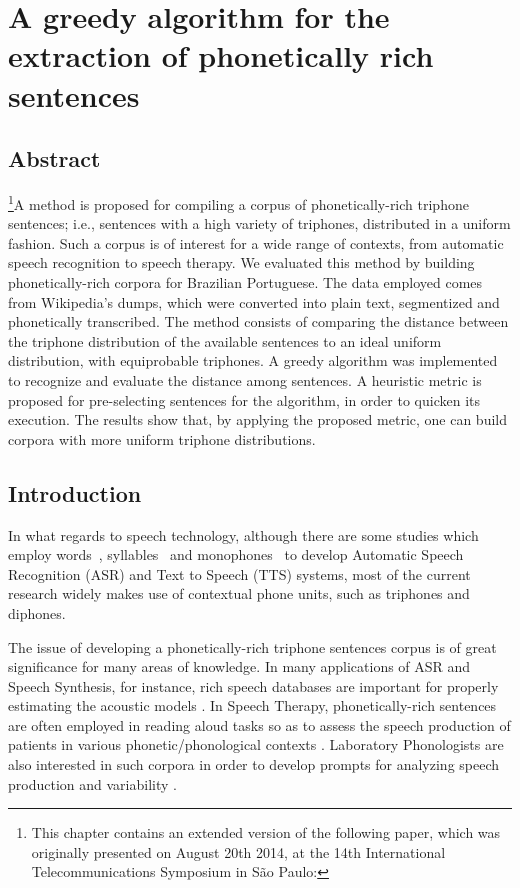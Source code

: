 \chapter{A greedy algorithm for the extraction of phonetically rich sentences}\label{ch:phonetically-rich}

\section*{Abstract}

\footnote{This chapter contains an extended version of the following paper, which was originally presented on August 20th 2014, at the 14th International Telecommunications Symposium in S\~ao Paulo: }A method is proposed for compiling a corpus of phonetically-rich triphone sentences; 
i.e., sentences with a high variety of triphones, distributed in a uniform fashion. 
Such a corpus is of interest for a wide range of contexts, from automatic speech 
recognition to speech therapy. We evaluated this method by building phonetically-rich corpora for Brazilian Portuguese. The data employed comes 
from Wikipedia's dumps, which were converted into plain text, segmentized and 
phonetically transcribed. The method consists of comparing the distance between 
the triphone distribution of the available sentences to an ideal uniform distribution, with 
equiprobable triphones. A greedy algorithm was implemented to recognize and evaluate 
the distance among sentences. A heuristic metric is proposed for pre-selecting 
sentences for the algorithm, in order to quicken its execution. The results show 
that, by applying the proposed metric, one can build corpora with more uniform 
triphone distributions.


\section{Introduction}

In what regards to speech technology, although there are some studies which employ words~\cite{Thanga2008}, syllables~\cite{Gana2001} and monophones~\cite{Kumar2014} to develop Automatic Speech Recognition (ASR) and Text to Speech (TTS) systems, most of the current research widely makes use of contextual phone units, such as triphones and diphones.

The issue of developing a phonetically-rich triphone sentences corpus is of great significance for many areas 
of knowledge. In many applications of  ASR and Speech Synthesis, for instance, rich speech databases are important for properly estimating the acoustic models \cite{Rabiner2007}. In Speech Therapy, phonetically-rich sentences are often employed in reading aloud tasks so as to assess the speech production of patients in various phonetic/phonological contexts \cite{Mendes2012}. Laboratory Phonologists
are also interested in such corpora in order to develop prompts for analyzing speech production and variability \cite{Pierrehumbert2000}.

